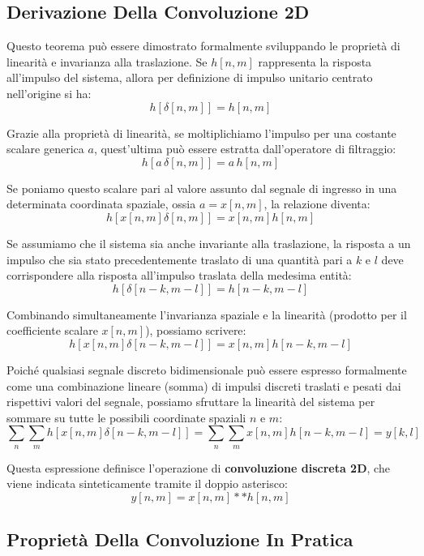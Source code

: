 ﻿\documentclass[11pt, a4paper]{article}
\begin{document}
\subsection{Derivazione Della Convoluzione 2D}

Questo teorema può essere dimostrato formalmente sviluppando le proprietà di linearità e invarianza alla traslazione.
Se $h[n,m]$ rappresenta la risposta all'impulso del sistema, allora per definizione di impulso unitario centrato nell'origine si ha:
\[ h[\delta[n,m]] = h[n,m] \]

Grazie alla proprietà di linearità, se moltiplichiamo l'impulso per una costante scalare generica $a$, quest'ultima può essere estratta dall'operatore di filtraggio:
\[ h[a \, \delta[n,m]] = a \, h[n,m] \]

Se poniamo questo scalare pari al valore assunto dal segnale di ingresso in una determinata coordinata spaziale, ossia $a = x[n,m]$, la relazione diventa:
\[ h[x[n,m] \delta[n,m]] = x[n,m] h[n,m] \]

Se assumiamo che il sistema sia anche invariante alla traslazione, la risposta a un impulso che sia stato precedentemente traslato di una quantità pari a $k$ e $l$ deve corrispondere alla risposta all'impulso traslata della medesima entità:
\[ h[\delta[n-k, m-l]] = h[n-k, m-l] \]

Combinando simultaneamente l'invarianza spaziale e la linearità (prodotto per il coefficiente scalare $x[n,m]$), possiamo scrivere:
\[ h[x[n,m] \delta[n-k, m-l]] = x[n,m] h[n-k, m-l] \]

Poiché qualsiasi segnale discreto bidimensionale può essere espresso formalmente come una combinazione lineare (somma) di impulsi discreti traslati e pesati dai rispettivi valori del segnale, possiamo sfruttare la linearità del sistema per sommare su tutte le possibili coordinate spaziali $n$ e $m$:
\[ \sum_{n}\sum_{m} h[x[n,m] \delta[n-k, m-l]] = \sum_{n}\sum_{m} x[n,m] h[n-k, m-l] = y[k,l] \]

Questa espressione definisce l'operazione di \textbf{convoluzione discreta 2D}, che viene indicata sinteticamente tramite il doppio asterisco:
\[ \boxed{y[n,m] = x[n,m] ** h[n,m]} \]

\subsection{Proprietà Della Convoluzione In Pratica}
\end{document}
